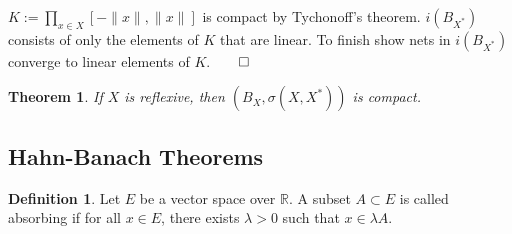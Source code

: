 \documentclass[12pt, reqno]{article}
\theoremstyle{plain}
\newtheorem*{theorem}{Theorem}
\theoremstyle{definition}
\newtheorem*{definition}{Definition}
\theoremstyle{remark}
\newcommand{\RR}{\mathbb{R}}
\begin{document}
$K := \prod_{x \in X} [-\|x\|, \|x\|]$ is compact by Tychonoff's theorem. $i(B_{X^*})$ consists of only the elements
of $K$ that are linear. To finish show nets in $i(B_{X^*})$ converge to linear elements of $K$.\hfill $\qed$

\begin{theorem}
    If $X$ is reflexive, then $(B_X, \sigma(X, X^*))$ is compact. 
\end{theorem}

\subsection*{Hahn-Banach Theorems}

\begin{definition}
    Let $E$ be a vector space over $\RR$. A subset $A \subset E$ is called absorbing if for all $x \in E$, there
    exists $\lambda > 0$ such that $x \in \lambda A$.
\end{definition}
\end{document}
